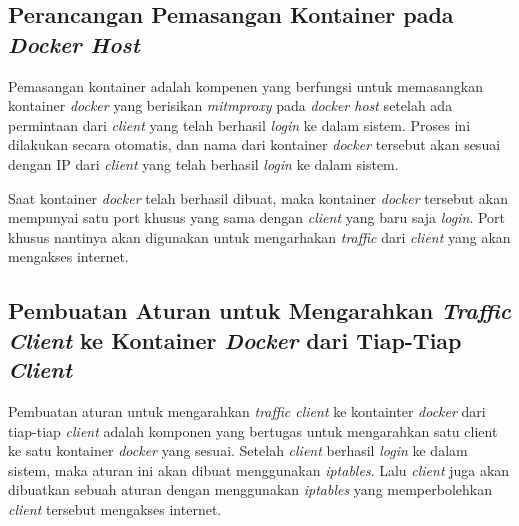     \subsection{Perancangan Pemasangan Kontainer pada \textit{Docker Host}}
	Pemasangan kontainer adalah kompenen yang berfungsi untuk memasangkan kontainer \textit{docker} yang berisikan \textit{mitmproxy} pada \textit{docker host} setelah ada permintaan dari \textit{client} yang telah berhasil \textit{login} ke dalam sistem. Proses ini dilakukan secara otomatis, dan nama dari kontainer \textit{docker} tersebut akan sesuai dengan IP dari \textit{client} yang telah berhasil \textit{login} ke dalam sistem.
	
	Saat kontainer \textit{docker} telah berhasil dibuat, maka kontainer \textit{docker} tersebut akan mempunyai satu port khusus yang sama dengan \textit{client} yang baru saja \textit{login}. Port khusus nantinya akan digunakan untuk mengarhakan \textit{traffic} dari \textit{client} yang akan mengakses internet.

   	\subsection{Pembuatan Aturan untuk Mengarahkan \textit{Traffic Client} ke Kontainer \textit{Docker} dari Tiap-Tiap \textit{Client}}
   	Pembuatan aturan untuk mengarahkan \textit{traffic client} ke kontainter \textit{docker} dari tiap-tiap \textit{client} adalah komponen yang bertugas untuk mengarahkan satu client ke satu kontainer \textit{docker} yang sesuai. Setelah \textit{client} berhasil \textit{login} ke dalam sistem, maka aturan ini akan dibuat menggunakan \textit{iptables}. Lalu \textit{client} juga akan dibuatkan sebuah aturan dengan menggunakan \textit{iptables} yang memperbolehkan \textit{client} tersebut mengakses internet.